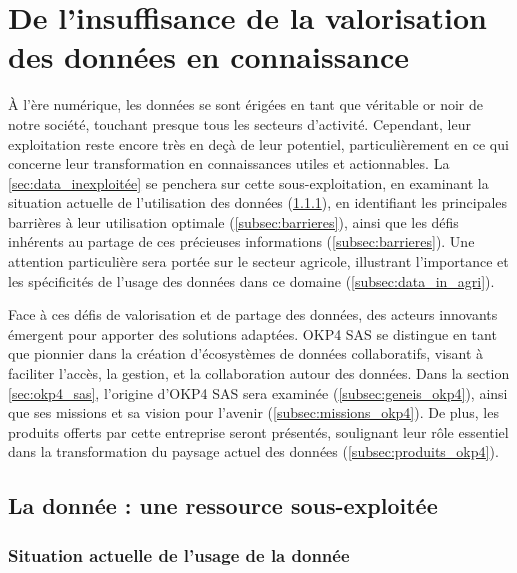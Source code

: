 \chapter{De l'insuffisance de la valorisation des données en connaissance}\label{chap:chapiter1}


À l'ère numérique, les données se sont érigées en tant que véritable or noir de notre société, touchant presque tous les secteurs d'activité. Cependant, leur exploitation reste encore très en deçà de leur potentiel, particulièrement en ce qui concerne leur transformation en connaissances utiles et actionnables. La \autoref{sec:data_inexploitée} se penchera sur cette sous-exploitation, en examinant la situation actuelle de l'utilisation des données (\ref{subsec:current_state}), en identifiant les principales barrières à leur utilisation optimale (\ref{subsec:barrieres}), ainsi que les défis inhérents au partage de ces précieuses informations (\ref{subsec:barrieres}). Une attention particulière sera portée sur le secteur agricole, illustrant l'importance et les spécificités de l'usage des données dans ce domaine (\ref{subsec:data_in_agri}).

Face à ces défis de valorisation et de partage des données, des acteurs innovants émergent pour apporter des solutions adaptées. OKP4 SAS se distingue en tant que pionnier dans la création d'écosystèmes de données collaboratifs, visant à faciliter l'accès, la gestion, et la collaboration autour des données. Dans la section \autoref{sec:okp4_sas}, l'origine d'OKP4 SAS sera examinée (\ref{subsec:geneis_okp4}), ainsi que ses missions et sa vision pour l'avenir (\ref{subsec:missions_okp4}). De plus, les produits offerts par cette entreprise seront présentés, soulignant leur rôle essentiel dans la transformation du paysage actuel des données (\ref{subsec:produits_okp4}).

\section{La donnée : une ressource sous-exploitée} \label{sec:data_inexploitée}

\subsection{Situation actuelle de l'usage de la donnée}\label{subsec:current_state}


